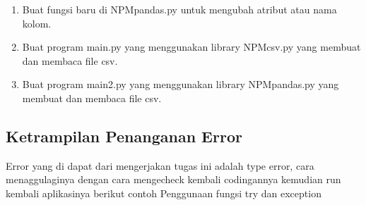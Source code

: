 \begin{enumerate}
	\item Buat fungsi baru di NPMpandas.py untuk mengubah atribut atau nama kolom.
	
	
	
	\item Buat program main.py yang menggunakan library NPMcsv.py yang membuat dan membaca file csv.
	
	
	
	\item Buat program main2.py yang menggunakan library NPMpandas.py yang membuat dan membaca file csv.
	
	
\end{enumerate}

\subsection{Ketrampilan Penanganan Error}
Error yang di dapat dari mengerjakan tugas ini adalah type error, cara menaggulaginya dengan cara mengecheck kembali codingannya
kemudian run kembali aplikasinya
berikut contoh Penggunaan fungsi try dan exception


